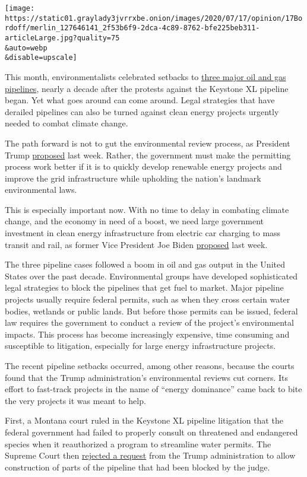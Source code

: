\texttt{[image: https://static01.graylady3jvrrxbe.onion/images/2020/07/17/opinion/17Bordoff/merlin\_127646141\_2f53b6f9-2dca-4c89-8762-bfe225beb311-articleLarge.jpg?quality=75\\\&auto=webp\\\&disable=upscale]}

This month, environmentalists celebrated setbacks to
\href{https://www.nytimes3xbfgragh.onion/reuters/2020/07/08/us/08reuters-usa-pipelines.html}{three
major oil and gas pipelines}, nearly a decade after the protests against
the Keystone XL pipeline began. Yet what goes around can come around.
Legal strategies that have derailed pipelines can also be turned against
clean energy projects urgently needed to combat climate change.

The path forward is not to gut the environmental review process, as
President Trump
\href{https://www.nytimes3xbfgragh.onion/2020/07/15/climate/trump-environment-nepa.html}{proposed}
last week. Rather, the government must make the permitting process work
better if it is to quickly develop renewable energy projects and improve
the grid infrastructure while upholding the nation's landmark
environmental laws.

This is especially important now. With no time to delay in combating
climate change, and the economy in need of a boost, we need large
government investment in clean energy infrastructure from electric car
charging to mass transit and rail, as former Vice President Joe Biden
\href{https://www.nytimes3xbfgragh.onion/2020/07/14/us/politics/biden-climate-plan.html}{proposed}
last week.

The three pipeline cases followed a boom in oil and gas output in the
United States over the past decade. Environmental groups have developed
sophisticated legal strategies to block the pipelines that get fuel to
market. Major pipeline projects usually require federal permits, such as
when they cross certain water bodies, wetlands or public lands. But
before those permits can be issued, federal law requires the government
to conduct a review of the project's environmental impacts. This process
has become increasingly expensive, time consuming and susceptible to
litigation, especially for large energy infrastructure projects.

The recent pipeline setbacks occurred, among other reasons, because the
courts found that the Trump administration's environmental reviews cut
corners. Its effort to fast-track projects in the name of ``energy
dominance'' came back to bite the very projects it was meant to help.

First, a Montana court ruled in the Keystone XL pipeline litigation that
the federal government had failed to properly consult on threatened and
endangered species when it reauthorized a program to streamline water
permits. The Supreme Court then
\href{https://www.supremecourt.gov/orders/courtorders/070620zr_2d83.pdf}{rejected
a request} from the Trump administration to allow construction of parts
of the pipeline that had been blocked by the judge.


